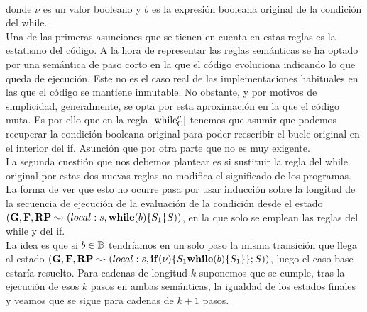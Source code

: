 \begin{prooftree*}
\end{prooftree*}\\
\begin{prooftree*}
\end{prooftree*} donde $\nu$ es un valor booleano y $b$ es la expresión booleana original de la condición del while.\\

Una de las primeras asunciones que se tienen en cuenta en estas reglas es la estatismo del código. A la hora de representar las reglas semánticas se ha optado por una semántica de paso corto en la que el código evoluciona indicando lo que queda de ejecución. Este no es el caso real de las implementaciones habituales en las que el código se mantiene inmutable. No obstante, y por motivos de simplicidad, generalmente, se opta por esta aproximación en la que el código muta. Es por ello que en la regla $\left[ \text{while}_{\text{C}}^{\nu} \right]$ tenemos que asumir que podemos recuperar la condición booleana original para poder reescribir el bucle original en el interior del if. Asunción que por otra parte que no es muy exigente.\\

La segunda cuestión que nos debemos plantear es si sustituir la regla del while original por estas dos nuevas reglas no modifica el significado de los programas. La forma de ver que esto no ocurre pasa por usar inducción sobre la longitud de la secuencia de ejecución de la evaluación de la condición desde el estado $(\mathbf{G}, \mathbf{F}, \textbf{RP} \leadsto (local:s, \mbox{\textbf{while}} (b) \{S_1\}S))$, en la que solo se emplean las reglas del while y del if.\\

La idea es que si $b \in \mathbb{B}$ tendríamos en un solo paso la misma transición que llega al estado $(\mathbf{G}, \mathbf{F}, \textbf{RP} \leadsto (local:s, \mbox{\textbf{if}} (\nu) \{S_1\mbox{\textbf{while}} (b) \{S_1\}\}\mbox{;\,}S))$, luego el caso base estaría resuelto. Para cadenas de longitud $k$ suponemos que se cumple, tras la ejecución de esos $k$ pasos en ambas semánticas, la igualdad de los estados finales y veamos que se sigue para cadenas de $k+1$ pasos.\\

